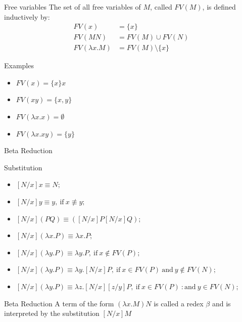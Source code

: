 \documentclass[aspectratio=169,10pt]{beamer}
\begin{document}
\begin{frame}{Free variables}
  The set of all free variables of $M$, called $FV(M)$, is defined inductively by:
  \begin{align*}
    FV(x) &= \{x\} \\
    FV(MN) &= FV(M) \cup FV(N) \\
    FV(\lambda x.M) &= FV(M) \setminus \{x\}
  \end{align*}

  \begin{block}{Examples}
    \begin{itemize}
      \item $FV(x) = \{ x \}x$
      \item $FV(xy) = \{ x, y\}$
      \item $FV(\lambda x.x) = \emptyset$
      \item $FV(\lambda x.xy) = \{y\}$
    \end{itemize}
  \end{block}
\end{frame}

\begin{frame}{Beta Reduction}
  \begin{block}{Substitution}
    \begin{itemize}
      \item $ [N/x]x \equiv N ; $
      \item $ [N/x]y \equiv y, \: \text{if}\: x \not\equiv y; $
      \item $ [N/x](PQ) \equiv ([N/x]P[N/x]Q) ; $
      \item $ [N/x](\lambda x.P) \equiv \lambda x.P ; $
      \item $ [N/x](\lambda y.P) \equiv \lambda y.P, \: \text{if}\: x \notin FV(P) ; $
      \item $ [N/x](\lambda y. P) \equiv \lambda y.[N/x]P, \: \text{if}\: x \in FV(P) \:\text{and}\: y \notin FV(N) ; $
      \item $ [N/x](\lambda y. P) \equiv \lambda z.[N/x][z/y]P, \: \text{if}\: x \in FV(P) \ :\text{and}\: y \in FV(N) ; $
    \end{itemize}
  \end{block}
  \pause

  \begin{block}{Beta Reduction}
    A term of the form $(\lambda x.M)N$ is called a redex $\beta$ and is interpreted by the substitution $[N/x]M$
  \end{block}
\end{frame}
\end{document}

